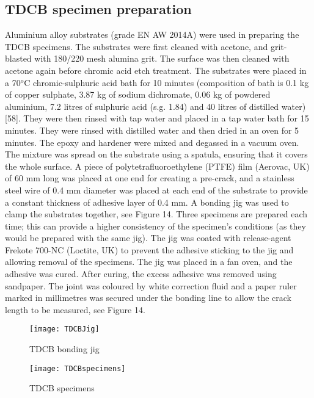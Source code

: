 \documentclass[numbers=noendperiod,chapterprefix=on]{icldt} %
\begin{document}
\subsection{TDCB specimen preparation}
Aluminium alloy substrates (grade EN AW 2014A) were used in preparing the TDCB specimens. The substrates were first cleaned with acetone, and grit-blasted with 180/220 mesh alumina grit. The surface was then cleaned with acetone again before chromic acid etch treatment. The substrates were placed in a 70$^o$C chromic-sulphuric acid bath for 10 minutes (composition of bath is 0.1 kg of copper sulphate, 3.87 kg of sodium dichromate, 0.06 kg of powdered aluminium, 7.2 litres of sulphuric acid (s.g. 1.84) and 40 litres of distilled water) [58]. They were then rinsed with tap water and placed in a tap water bath for 15 minutes. They were rinsed with distilled water and then dried in an oven for 5 minutes.
The epoxy and hardener were mixed and degassed in a vacuum oven. The mixture was spread on the substrate using a spatula, ensuring that it covers the whole surface. A piece of polytetrafluoroethylene (PTFE) film (Aerovac, UK) of 60 mm long was placed at one end for creating a pre-crack, and a stainless steel wire of 0.4 mm diameter was placed at each end of the substrate to provide a constant thickness of adhesive layer of 0.4 mm.
A bonding jig was used to clamp the substrates together, see Figure 14. Three specimens are prepared each time; this can provide a higher consistency of the specimen’s conditions (as they would be prepared with the same jig). The jig was coated with release-agent Frekote 700-NC (Loctite, UK) to prevent the adhesive sticking to the jig and allowing removal of the specimens. The jig was placed in a fan oven, and the adhesive was cured.
After curing, the excess adhesive was removed using sandpaper. The joint was coloured by white correction fluid and a paper ruler marked in millimetres was secured under the bonding line to allow the crack length to be measured, see Figure 14.

\begin{figure}[!htpb]
\centering
\texttt{[image: TDCBJig]}
\caption{TDCB bonding jig} %
\end{figure}
\FloatBarrier
\begin{figure}[!htpb]
\centering
\texttt{[image: TDCBspecimens]}
\caption{TDCB specimens} %
\end{figure}
\FloatBarrier
\end{document}
